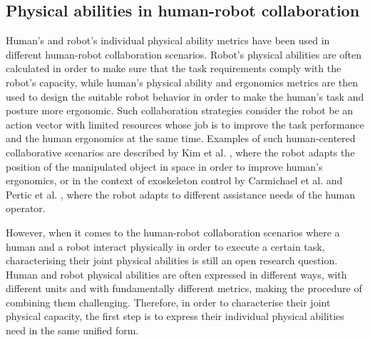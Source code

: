     

\subsection{Physical abilities in human-robot collaboration}

Human's and robot's individual physical ability metrics have been used in different human-robot collaboration scenarios. Robot's physical abilities are often calculated in order to make sure that the task requirements comply with the robot's capacity, while human's physical ability and ergonomics metrics are then used to design the suitable robot behavior in order to make the human's task and posture more ergonomic. Such collaboration strategies consider the robot be an action vector with limited resources whose job is to improve the task performance and the human ergonomics at the same time. Examples of such human-centered collaborative scenarios are described by Kim et al. \cite{KIM2021102084}, where the robot adapts the position of the manipulated object in space in order to improve human's ergonomics, or in the context of exoskeleton control by Carmichael et al. \cite{carmichael2013admittance,carmichael_towards_2011} and Pertic et al. \cite{petric2019assistive}, where the robot adapts to different assistance needs of the human operator.

However, when it comes to the human-robot collaboration scenarios where a human and a robot interact physically in order to execute a certain task, characterising their joint physical abilities is still an open research question. Human and robot physical abilities are often expressed in different ways, with different units and with fundamentally different metrics, making the procedure of combining them challenging. Therefore, in order to characterise their joint physical capacity, the first step is to express their individual physical abilities need in the same unified form. 

